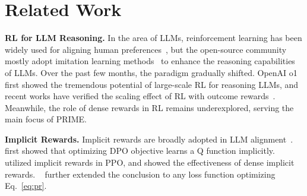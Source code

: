 \section{Related Work}
\textbf{RL for LLM Reasoning.}
In the area of LLMs, reinforcement learning has been widely used for aligning human preferences~\citep{christiano2017deep,ouyang2022training,Cui2023ULTRAFEEDBACKBL}, but the open-source community mostly adopt imitation learning methods~\citep{Yuan2024AdvancingLR,Yue2024MAmmoTH2SI,wei2024magicoder,liu2024acemath} to enhance the reasoning capabilities of LLMs.
Over the past few months, the paradigm gradually shifted. OpenAI o1~\citep{jaech2024openai} first showed the tremendous potential of large-scale RL for reasoning LLMs, and recent works have verified the scaling effect of RL with outcome rewards~\citep{deepseekai2025deepseekr1incentivizingreasoningcapability,team2025kimi}.
Meanwhile, the role of dense rewards in RL remains underexplored, serving the main focus of PRIME.


\textbf{Implicit Rewards.}
Implicit rewards are broadly adopted in LLM alignment~\citep{rafailov2024direct,chen2024noise,Azar2023IPO,Ethayarajh2024KTOMA,Rosset2024DirectNO,chen2024bootstrapping}. ~\citet{rafailov2024r} first showed that optimizing DPO objective learns a Q function implicitly. 
\citet{zhou2024weak} utilized implicit rewards in PPO, and showed the effectiveness of dense implicit rewards. 
~\citet{yuan2024freeprocessrewardsprocess} further extended the conclusion to any loss function optimizing Eq.~\ref{eq:pr}.